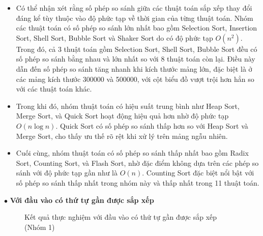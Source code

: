 \begin{itemize}[label=$\circ$]
    \item Có thể nhận xét rằng số phép so sánh giữa các thuật toán sắp 
    xếp thay đổi đáng kể tùy thuộc vào độ phức tạp về thời gian của từng 
    thuật toán. Nhóm các thuật toán có số phép so sánh lớn nhất bao gồm 
    Selection Sort, Insertion Sort, Shell Sort, Bubble Sort và Shaker 
    Sort do có độ phức tạp $O\left(n^2\right)$. Trong đó, cả 3 thuật toán 
    gồm Selection Sort, Shell Sort, Bubble Sort đều có số phép so sánh 
    bằng nhau và lớn nhất so với 8 thuật toán còn lại. Điều này dẫn đến 
    số phép so sánh tăng nhanh khi kích thước mảng lớn, đặc biệt là ở các 
    mảng kích thước 300000 và 500000, với cột biểu đồ vượt trội hơn hẳn 
    so với các thuật toán khác.
	\item Trong khi đó, nhóm thuật toán có hiệu suất trung bình như Heap 
    Sort, Merge Sort, và Quick Sort hoạt động hiệu quả hơn nhờ độ phức 
    tạp $O\left(n\log{n}\right)$. Quick Sort có số phép so sánh thấp hơn 
    so với Heap Sort và Merge Sort, cho thấy ưu thế rõ rệt khi xử lý trên 
    mảng ngẫu nhiên.
	\item Cuối cùng, nhóm thuật toán có số phép so sánh thấp nhất bao 
    gồm Radix Sort, Counting Sort, và Flash Sort, nhờ đặc điểm không dựa 
    trên các phép so sánh với độ phức tạp gần như là $O\left(n\right)$. 
    Counting Sort đặc biệt nổi bật với số phép so sánh thấp nhất trong 
    nhóm này và thấp nhất trong 11 thuật toán.
\end{itemize}

$\bullet$ \textbf{Với đầu vào có thứ tự gần được sắp xếp}

\begin{figure}[H]
\caption{Kết quả thực nghiệm với đầu vào có thứ tự gần được sắp xếp (Nhóm 1)}
\end{figure}


